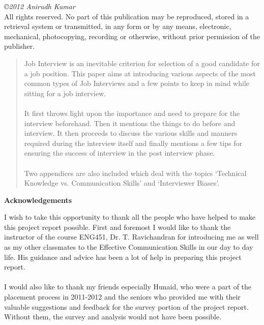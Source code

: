 \documentclass[a4paper,12pt]{report}
\makeatletter
\newcommand\ackname{Acknowledgements}
\newenvironment{acknowledgements}{%
      \titlepage
      \null\vfil
      \@beginparpenalty\@lowpenalty
      \begin{center}%
        \bfseries \ackname
        \@endparpenalty\@M
      \end{center}}%
     {\par\vfil\null\endtitlepage}
\newenvironment{acknowledgements}{%
      \if@twocolumn
        \section*{\abstractname}%
      \else
        \small
        \begin{center}%
          {\bfseries \ackname\vspace{-.5em}\vspace{\z@}}%
        \end{center}%
        \quotation
      \fi}
      {\if@twocolumn\else\endquotation\fi}
\makeatother
\begin{document}


\emph{\copyright 2012 Anirudh Kumar}\\
All rights reserved. No part of this publication may be reproduced, stored in a retrieval system or transmitted,
in any form or by any means, electronic, mechanical, photocopying, recording or otherwise, without prior
permission of the publisher.

\begin{abstract}
Job Interview is an inevitable criterion for selection of a good candidate for a job position. This paper aims at introducing various aspects
of the most common types of Job Interviews and a few points to keep in mind while sitting for a job interview.
\paragraph{}
It first throws light upon the importance and need to prepare for the interview beforehand. Then it mentions the
things to do before and interview. It then proceeds to discuss the various skills and manners required during the interview itself 
and finally mentions a few tips for ensuring the success of interview in the post interview phase.
\paragraph{}
Two appendices are also included which deal with the topics `Technical Knowledge vs. Communication Skills'
and `Interviewer Biases'.
\end{abstract}

\begin{acknowledgements}
I wish to take this opportunity to thank all the people who have helped to make this project report possible.
 First and foremost I would like to thank the instructor of the course ENG451, Dr. T. Ravichandran
for introducing me as well as my other classmates to the Effective Communication Skills
 in our day to day life. His guidance and advice has been a lot of help in preparing this project report.
\paragraph{}
I would also like to thank my friends especially Hunaid, who were a part of the placement process in
2011-2012 and the seniors who provided me with their valuable suggestions and feedback for
the survey portion of the project report. Without them, the survey and analysis would not have been possible.
\end{acknowledgements}
\end{document}
